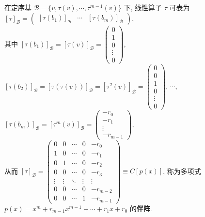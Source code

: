 \documentclass{note}
\begin{document}
\begin{df}[伴阵]
    在定序基 $\mathcal{B}=\{v,\tau(v),\cdots,\tau^{m-1}(v)\}$ 下, 线性算子 $\tau$ 可表为 $[\tau]_{\mathcal{B}}=\begin{pmatrix}
            [\tau(b_1)]_{\mathcal{B}}&\cdots&[\tau(b_m)]_{\mathcal{B}}
    \end{pmatrix}$,\\
    其中 $[\tau(b_1)]_{\mathcal{B}}=[\tau(v)]_{\mathcal{B}}=\begin{pmatrix}
        0\\
        1\\
        0\\
        \vdots\\
        0
    \end{pmatrix}$, $[\tau(b_2)]_{\mathcal{B}}=[\tau(\tau(v))]_{\mathcal{B}}=[\tau^2(v)]_{\mathcal{B}}=\begin{pmatrix}
        0\\
        0\\
        1\\
        0\\
        \vdots\\
        0
    \end{pmatrix}$, $\cdots$, $[\tau(b_m)]_{\mathcal{B}}=[\tau^m(v)]_{\mathcal{B}}=\begin{pmatrix}
        -r_0\\
        -r_1\\
        \vdots\\
        -r_{m-1}
    \end{pmatrix}$,\\
    从而 $[\tau]_{\mathcal{B}}=\begin{pmatrix}
        0&0&\cdots&0&-r_0\\
        1&0&\cdots&0&-r_1\\
        0&1&\cdots&0&-r_2\\
        0&0&\cdots&0&-r_3\\
        \vdots&\vdots&\ddots&\vdots&\vdots\\
        0&0&\cdots&0&-r_{m-2}\\
        0&0&\cdots&1&-r_{m-1}
    \end{pmatrix}\equiv C[p(x)]$, 称为多项式 $p(x)=x^m+r_{m-1}x^{m-1}+\cdots+r_1x+r_0$ 的\textbf{伴阵}.
\end{df}
\end{document}
